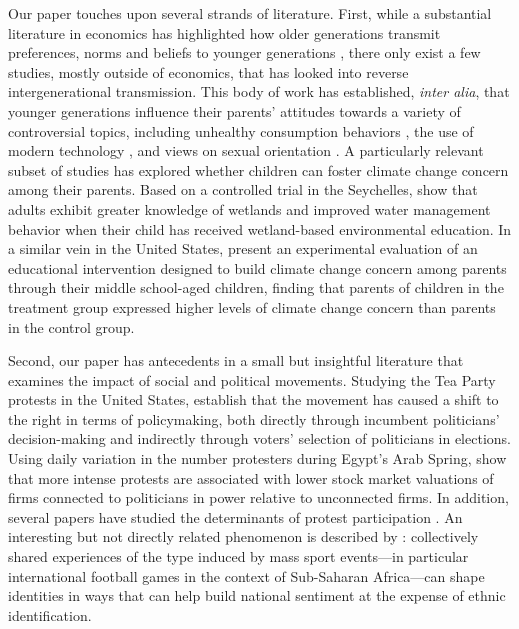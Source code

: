 Our paper touches upon several strands of literature. First, while a substantial literature in economics has highlighted how older generations transmit preferences, norms and beliefs to younger generations  \citep{bisin2001economics,fernandez2004mothers,fernandez2009culture,figlio2019longterm}, there only exist a few studies, mostly outside of economics, that has looked into reverse intergenerational transmission. This body of work has established, \emph{inter alia}, that younger generations influence their parents' attitudes towards a variety of controversial topics, including unhealthy consumption behaviors \citep{flurry2005children}, the use of modern technology \citep{baily2009reverse}, and views on sexual orientation \citep{lasala2000lesbians}. A particularly relevant subset of studies has explored whether children can foster climate change concern among their parents. Based on a controlled trial in the Seychelles, \citet{damerell2013child} show that adults exhibit greater knowledge of wetlands and improved water management behavior when their child has received wetland-based environmental education. In a similar vein in the United States, \citet{lawson2019children}  present an experimental evaluation of an educational intervention designed to build climate change concern among parents through their middle school-aged children, finding that parents of children in the treatment group expressed higher levels of climate change concern than parents in the control group. 


Second, our paper has antecedents in a small but insightful literature that examines the impact of social and political movements. Studying the Tea Party protests in the United States, \citet{madestam2013political} establish that the movement has caused a shift to the right in terms of policymaking, both directly through incumbent politicians' decision-making and indirectly through voters' selection of politicians in elections. Using daily variation in the number protesters during Egypt's Arab Spring, \citet{acemoglu2018power} show that more intense protests are associated with lower stock market valuations of firms connected to politicians in power relative to unconnected firms. In addition, several papers have studied the determinants of protest participation \citep{finkel1991party,finkel1998rational,cantoni2019protests,bursztyn2020persistent}. An interesting but not directly related phenomenon is described by \citet{depetris2020building}: collectively  shared  experiences  of  the  type  induced  by  mass sport events---in particular international  football games in the context of Sub-Saharan Africa---can  shape  identities  in  ways  that  can  help  build  national  sentiment  at  the  expense  of  ethnic  identification.  


